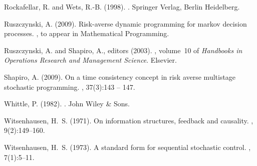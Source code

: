 \documentclass[a4paper]{amsart}
\theoremstyle{plain}
\theoremstyle{definition}
\theoremstyle{remark}
\begin{document}
\begin{thebibliography}{}
Rockafellar, R. and Wets, R.-B. (1998).
.
\newblock Springer Verlag, Berlin Heidelberg.

Ruszczynski, A. (2009).
\newblock Risk-averse dynamic programming for markov decision processes.
, to appear in Mathematical Programming.

Ruszczynski, A. and Shapiro, A., editors (2003).
, volume~10 of {\em Handbooks in
  Operations Research and Management Science}.
\newblock Elsevier.

Shapiro, A. (2009).
\newblock On a time consistency concept in risk averse multistage stochastic
  programming.
, 37(3):143 -- 147.

Whittle, P. (1982).
.
\newblock John Wiley \& Sons.

Witsenhausen, H.~S. (1971).
\newblock On information structures, feedback and causality.
, 9(2):149--160.

Witsenhausen, H.~S. (1973).
\newblock A standard form for sequential stochastic control.
, 7(1):5--11.

\end{thebibliography}
\end{document}
